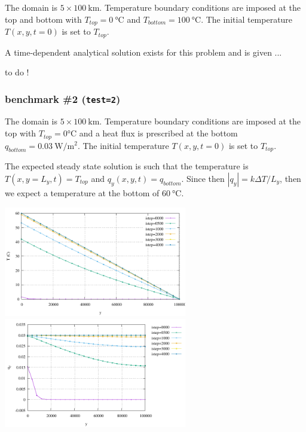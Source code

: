 The domain is $5\times 100~\si{\km}$. 
Temperature boundary conditions are imposed at the top and bottom with 
$T_{top}=0~\si{\celsius}$
and $T_{bottom}=100~\si{\celsius}$.
The initial temperature $T(x,y,t=0)$ is set to $T_{top}$.

A time-dependent analytical solution exists for this problem and is given ...

{\color{red} to do !}

\subsubsection*{benchmark \#2 ({\tt test=2})}

The domain is $5\times 100~\si{\km}$. 
Temperature boundary conditions are imposed at the top with 
$T_{top}=0\si{\celsius}$
and a heat flux is prescribed at the bottom 
$q_{bottom}=0.03~\si{\watt\per\square\meter}$.
The initial temperature $T(x,y,t=0)$ is set to $T_{top}$.

The expected steady state solution is such that the temperature is 
$T(x,y=L_y,t)=T_{top}$ and $q_y(x,y,t)=q_{bottom}$. 
Since then $|q_y|=k \Delta T/L_y$, then we expect a temperature at the
bottom of $60~\si{\celsius}$.

\begin{center}
\includegraphics[width=8cm]{python_codes/fieldstone_141/results/test2/temperature}
\includegraphics[width=8cm]{python_codes/fieldstone_141/results/test2/heat_flux}
\end{center}

